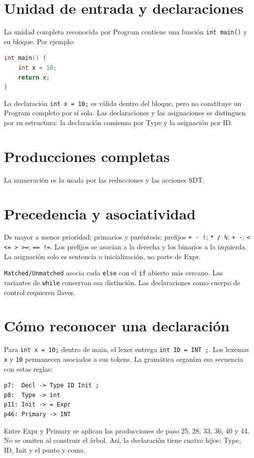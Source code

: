 \section*{Unidad de entrada y declaraciones}
La unidad completa reconocida por Program contiene una función \texttt{int main()} y su bloque. Por ejemplo:
\begin{lstlisting}[language=C]
int main() {
    int x = 10;
    return x;
}
\end{lstlisting}
La declaración \texttt{int x = 10;} es válida dentro del bloque, pero no constituye un Program completo por sí sola. Las declaraciones y las asignaciones se distinguen por su estructura: la declaración comienza por Type y la asignación por ID.
\clearpage\section*{Producciones completas}
La numeración es la usada por las reducciones y las acciones SDT.
{\footnotesize\renewcommand{\arraystretch}{1.0}}
\clearpage\section*{Precedencia y asociatividad}
De mayor a menor prioridad: primarios y paréntesis; prefijos \texttt{+ - !}; \texttt{* / \%}; \texttt{+ -}; \texttt{< <= > >=}; \texttt{== !=}. Los prefijos se asocian a la derecha y los binarios a la izquierda. La asignación solo es sentencia o inicialización, no parte de Expr.

\texttt{Matched/Unmatched} asocia cada \texttt{else} con el \texttt{if} abierto más cercano. Las variantes de \texttt{while} conservan esa distinción. Las declaraciones como cuerpo de control requieren llaves.

\section*{Cómo reconocer una declaración}
Para \texttt{int x = 10;} dentro de main, el lexer entrega \texttt{int ID = INT ;}. Los lexemas \texttt{x} y \texttt{10} permanecen asociados a sus tokens. La gramática organiza esa secuencia con estas reglas:
\begin{lstlisting}
p7:  Decl -> Type ID Init ;
p8:  Type -> int
p11: Init -> = Expr
p46: Primary -> INT
\end{lstlisting}
Entre Expr y Primary se aplican las producciones de paso 25, 28, 33, 36, 40 y 44. No se omiten al construir el árbol. Así, la declaración tiene cuatro hijos: Type, ID, Init y el punto y coma.

